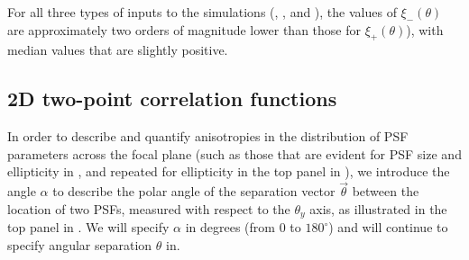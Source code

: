 \documentclass[twocolumn,twocolappendix]{openjournal}
\begin{document}
For all three types of inputs to the simulations (\psfwssims, \bench, and \match), the values of $\xi_-(\theta)$ are approximately two orders of magnitude lower than those for $\xi_+(\theta)$), with median values that are slightly positive.

\subsection{2D two-point correlation functions}
\label{sec:anisocovar}
In order to describe and quantify anisotropies in the distribution of PSF parameters across the focal plane (such as those that are evident for PSF size and ellipticity in , and repeated for ellipticity in the top panel in ), we introduce the angle $\alpha$ to describe the polar angle of the separation vector $\vec\theta$ between the location of two PSFs, measured with respect to the $\theta_y$ axis, as illustrated in the top panel in .
We will specify $\alpha$ in degrees (from 0 to $180^\circ$) and  will continue to specify angular separation $\theta$ in\amin. 
\end{document}
